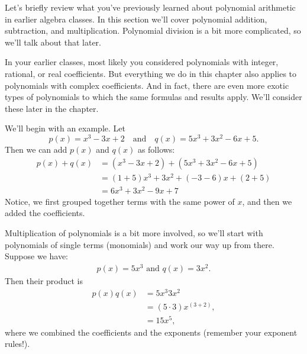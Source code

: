Let's briefly review what you've previously learned about polynomial arithmetic in earlier algebra classes.  In this section we'll cover polynomial addition, subtraction, and multiplication. Polynomial division is a bit more complicated, so we'll talk about that later.

In your earlier classes, most likely you considered polynomials with integer, rational, or real coefficients. But everything we do in this chapter also applies to polynomials with complex coefficients.  And in fact, there are even more exotic types of polynomials to which the same formulas and results apply. We'll consider these later in the chapter.

We'll begin with an example. Let
$$ p(x)  = x^3 -3x +2  \quad \text{and} \quad q(x)  = 5x^3+3x^2 -6x +5.$$
Then we can add $p(x)$ and $q(x)$ as follows: 
\begin{align*}
p(x) + q(x) 
& =  ( x^3 - 3 x + 2 ) + ( 5x^3+3 x^2 - 6 x + 5 ) \\
& =   (1+5)x^3 +3x^2+(-3-6)x + (2+5) \\
& = 6x^3 + 3 x^2 - 9 x + 7
\end{align*}
Notice, we first grouped together terms with the same power of  $x$, and then we added the coefficients.

Multiplication of polynomials is a bit more involved, so we'll start with polynomials of single terms (monomials) and work our way up from there.  Suppose we have:
\begin{align*} 
p(x)  = 5x^3\text{ and }  
q(x)  = 3x^2.
\end{align*}
Then their product is
\begin{align*}
p(x)  q(x) 
& =  5x^3 3 x^2 \\
& = (5 \cdot 3)x^{(3 + 2)}, \\
& = 15x^5,
\end{align*}
where we combined the coefficients and the exponents (remember your exponent rules!).  

